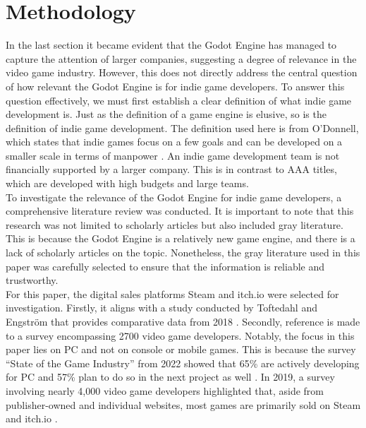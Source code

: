 \section{Methodology}
In the last section it became evident that the Godot Engine has managed to capture the attention of larger companies, suggesting a degree of relevance in the video game industry.
However, this does not directly address the central question of how relevant the Godot Engine is for indie game developers.
To answer this question effectively, we must first establish a clear definition of what indie game development is.
Just as the definition of a game engine is elusive, so is the definition of indie game development.
The definition used here is from O'Donnell, which states that indie games focus on a few goals and can be developed on a smaller scale in terms of manpower \cite{indie-definition}.
An indie game development team is not financially supported by a larger company.
This is in contrast to AAA titles, which are developed with high budgets and large teams.\\

To investigate the relevance of the Godot Engine for indie game developers, a comprehensive literature review was conducted.
It is important to note that this research was not limited to scholarly articles but also included gray literature.
This is because the Godot Engine is a relatively new game engine, and there is a lack of scholarly articles on the topic.
Nonetheless, the gray literature used in this paper was carefully selected to ensure that the information is reliable and trustworthy. \\ 

For this paper, the digital sales platforms Steam and itch.io were selected for investigation.
Firstly, it aligns with a study conducted by Toftedahl and Engström that provides comparative data from 2018 \cite{game-engine-taxonomy}.
Secondly, reference is made to a survey encompassing 2700 video game developers. %
Notably, the focus in this paper lies on PC and not on console or mobile games.
This is because the survey ``State of the Game Industry'' from 2022 showed that 65\% are actively developing for PC and 57\% plan to do so in the next project as well \cite{gdc-2023}.
In 2019, a survey involving nearly 4,000 video game developers highlighted that, aside from publisher-owned and individual websites, most games are primarily sold on Steam and itch.io \cite{gdc-2019}.\\

